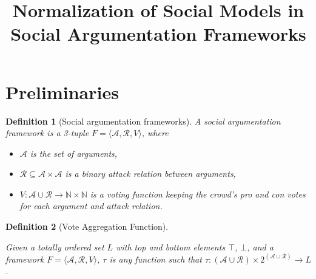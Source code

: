 \documentclass{article}
\date{ }
\newtheorem{definition}{Definition}
\newcommand{\nat}{\mathbb{N}}   %
\newcommand{\args}{\mathcal{A}} %
\newcommand{\att}{\mathcal{R}}  %
\newcommand{\valueset}{L}
\newcommand{\obj}{\mathcal{O}} %
\newcommand{\safid}{F}               %
\newcommand{\saf}{\safid = \safbody} %
\newcommand{\safbody}{\langle \args, \att, V \rangle} %
\begin{document}
\date{}
\title{Normalization of Social Models in Social Argumentation Frameworks}
\maketitle

\section{Preliminaries}


\begin{definition}[Social argumentation frameworks]
A \emph{social argumentation framework} is a 3-tuple $\saf$, where
\begin{itemize}
  \item $\args$ is the set of arguments,
  \item $\att \subseteq \args \times \args$ is a binary attack relation between arguments,
  \item $V : \args \cup \att \to \nat \times \nat$ is a voting function keeping the crowd's pro and con votes for each argument and attack relation.
\end{itemize}
\end{definition}

\begin{definition}[Vote Aggregation Function]
\label{def:voteAgg}

Given a totally ordered set $\valueset$ with top and bottom elements $\top$, $\bot$, and a framework $\saf$, $\tau$ is any function such that $\tau:  (\args \cup \att)  \times {2}^{ (\args \cup \att)} \to L$.
\end{definition}
\end{document}
